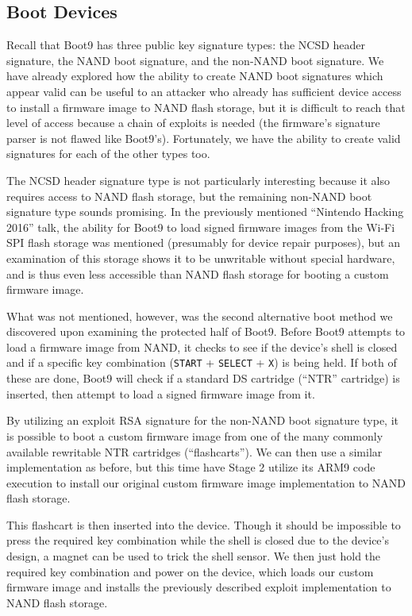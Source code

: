\documentclass[journal]{IEEEtran}
\begin{document}
\subsection{Boot Devices}

Recall that Boot9 has three public key signature types: the NCSD header
signature, the NAND boot signature, and the non-NAND boot signature. We have
already explored how the ability to create NAND boot signatures which appear
valid can be useful to an attacker who already has sufficient device access to
install a firmware image to NAND flash storage, but it is difficult to reach
that level of access because a chain of exploits is needed (the firmware's
signature parser is not flawed like Boot9's). Fortunately, we have the ability
to create valid signatures for each of the other types too.

The NCSD header signature type is not particularly interesting because it also
requires access to NAND flash storage, but the remaining non-NAND boot signature
type sounds promising. In the previously mentioned ``Nintendo Hacking 2016''
talk, the ability for Boot9 to load signed firmware images from the Wi-Fi SPI
flash storage was mentioned (presumably for device repair purposes), but an
examination of this storage shows it to be unwritable without special hardware,
and is thus even less accessible than NAND flash storage for booting a custom
firmware image.

What was not mentioned, however, was the second alternative boot method we
discovered upon examining the protected half of Boot9. Before Boot9 attempts to
load a firmware image from NAND, it checks to see if the device's shell is
closed and if a specific key combination (\texttt{START} + \texttt{SELECT} +
\texttt{X}) is being held. If both of these are done, Boot9 will check if a
standard DS cartridge (``NTR'' cartridge) is inserted, then attempt to load a
signed firmware image from it.

By utilizing an exploit RSA signature for the non-NAND boot signature type, it
is possible to boot a custom firmware image from one of the many commonly
available rewritable NTR cartridges (``flashcarts''). We can then use a similar
implementation as before, but this time have Stage 2 utilize its ARM9 code
execution to install our original custom firmware image implementation to NAND
flash storage.

This flashcart is then inserted into the device. Though it should be impossible
to press the required key combination while the shell is closed due to the
device's design, a magnet can be used to trick the shell sensor. We then just
hold the required key combination and power on the device, which loads our
custom firmware image and installs the previously described exploit
implementation to NAND flash storage.
\end{document}
